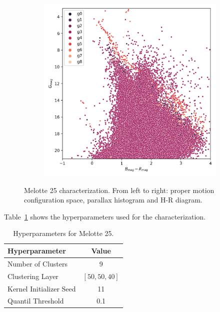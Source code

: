 \documentclass[11pt,a4paper,english,twocolumn]{article}
\begin{document}
\begin{figure}[!hbt]
\begin{subfigure}[t]{0.30\textwidth}
  \end{subfigure}
  \hfill
  \begin{subfigure}[t]{0.30\textwidth}
    \centering
    \includegraphics[width=\textwidth]{../figures/melotte_25/dec_hr_diagram_melotte_25.png}
  \end{subfigure}
  \caption{Melotte 25 characterization.
           From left to right: proper motion configuration space,
           parallax histogram and H-R diagram.}
  \label{fig:result_melotte_25_dec}
\end{figure}

Table~\ref{tab:hyperparameters_melotte_25} shows the hyperparameters
used for the characterization.

\begin{table}[h]
  \begin{center}
    \begin{tabular}{l|c}
      \textbf{Hyperparameter} & \textbf{Value} \\
      \hline
      Number of Clusters & 9 \\
      Clustering Layer & \(\left[ 50, 50, 40 \right]\) \\
      Kernel Initializer Seed & 11 \\
      Quantil Threshold & 0.1 \\
    \end{tabular}
    \caption{Hyperparameters for Melotte 25.}
    \label{tab:hyperparameters_melotte_25}
  \end{center}
\end{table}
\end{document}
